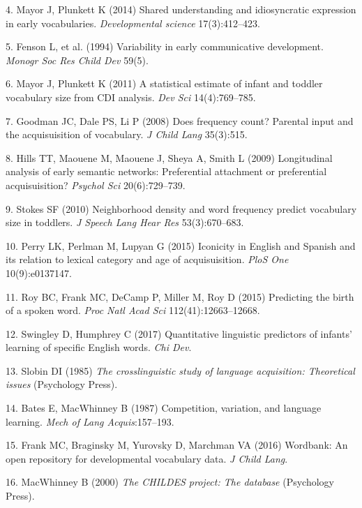 \documentclass[english,man]{apa6}
\theoremstyle{definition}
\theoremstyle{definition}
\theoremstyle{definition}
\theoremstyle{remark}
\begin{document}
\hypertarget{ref-mayor2014}{}
4. Mayor J, Plunkett K (2014) Shared understanding and idiosyncratic
expression in early vocabularies. \emph{Developmental science}
17(3):412--423.

\hypertarget{ref-fenson1994}{}
5. Fenson L, et al. (1994) Variability in early communicative
development. \emph{Monogr Soc Res Child Dev} 59(5).

\hypertarget{ref-mayor2011}{}
6. Mayor J, Plunkett K (2011) A statistical estimate of infant and
toddler vocabulary size from CDI analysis. \emph{Dev Sci}
14(4):769--785.

\hypertarget{ref-goodman2008}{}
7. Goodman JC, Dale PS, Li P (2008) Does frequency count? Parental input
and the acquisuisition of vocabulary. \emph{J Child Lang} 35(3):515.

\hypertarget{ref-hills2009}{}
8. Hills TT, Maouene M, Maouene J, Sheya A, Smith L (2009) Longitudinal
analysis of early semantic networks: Preferential attachment or
preferential acquisuisition? \emph{Psychol Sci} 20(6):729--739.

\hypertarget{ref-stokes2010}{}
9. Stokes SF (2010) Neighborhood density and word frequency predict
vocabulary size in toddlers. \emph{J Speech Lang Hear Res}
53(3):670--683.

\hypertarget{ref-perry2015}{}
10. Perry LK, Perlman M, Lupyan G (2015) Iconicity in English and
Spanish and its relation to lexical category and age of acquisuisition.
\emph{PloS One} 10(9):e0137147.

\hypertarget{ref-roy2015}{}
11. Roy BC, Frank MC, DeCamp P, Miller M, Roy D (2015) Predicting the
birth of a spoken word. \emph{Proc Natl Acad Sci} 112(41):12663--12668.

\hypertarget{ref-swingley2017}{}
12. Swingley D, Humphrey C (2017) Quantitative linguistic predictors of
infants' learning of specific English words. \emph{Chi Dev}.

\hypertarget{ref-slobin1985}{}
13. Slobin DI (1985) \emph{The crosslinguistic study of language
acquisition: Theoretical issues} (Psychology Press).

\hypertarget{ref-bates1987}{}
14. Bates E, MacWhinney B (1987) Competition, variation, and language
learning. \emph{Mech of Lang Acquis}:157--193.

\hypertarget{ref-frank2016}{}
15. Frank MC, Braginsky M, Yurovsky D, Marchman VA (2016) Wordbank: An
open repository for developmental vocabulary data. \emph{J Child Lang}.

\hypertarget{ref-macwhinney2000}{}
16. MacWhinney B (2000) \emph{The CHILDES project: The database}
(Psychology Press).
\end{document}
